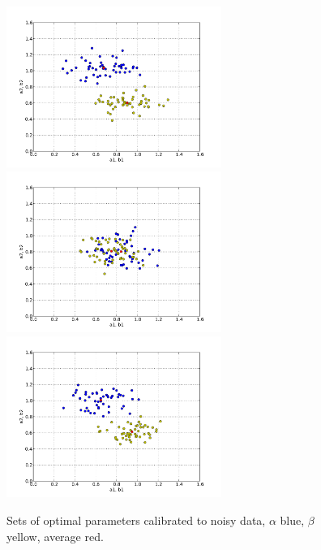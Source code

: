 \begin{figure}
\begin{center}
    \includegraphics[width=7cm]{chapters/schroll/pdf/4Dsample3b-5.pdf}
    \includegraphics[width=7cm]{chapters/schroll/pdf/4Dsample4-5.pdf}
    \includegraphics[width=7cm]{chapters/schroll/pdf/4Dsample4b-5.pdf}
    \end{center}
    \vspace{-0.7cm}
  \caption{Sets of optimal parameters calibrated to noisy data, $\alpha$ blue, $\beta$ yellow, average red. \label{fig7}}
\end{figure}

